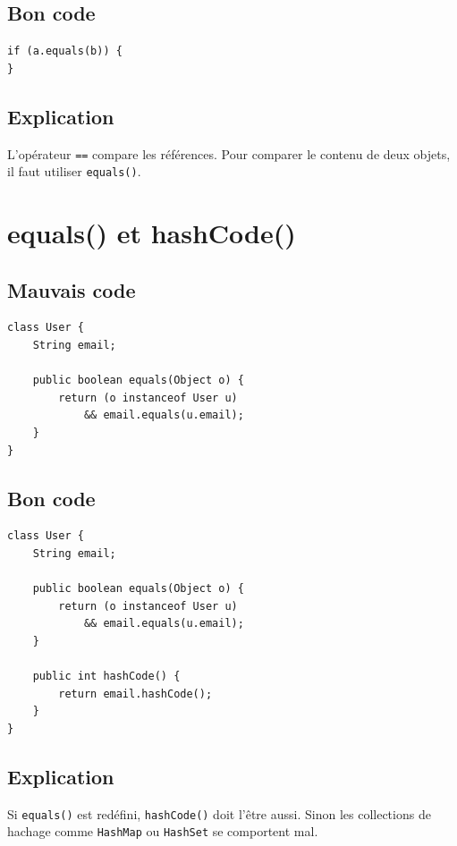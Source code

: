 \documentclass[a4paper,11pt]{report}
\begin{document}
\section{Bon code}
\begin{lstlisting}
if (a.equals(b)) {
}
\end{lstlisting}

\section{Explication}
L'opérateur \texttt{==} compare les références.
Pour comparer le contenu de deux objets, il faut utiliser \texttt{equals()}.

\chapter{equals() et hashCode()}

\section{Mauvais code}
\begin{lstlisting}
class User {
    String email;

    public boolean equals(Object o) {
        return (o instanceof User u)
            && email.equals(u.email);
    }
}
\end{lstlisting}

\section{Bon code}
\begin{lstlisting}
class User {
    String email;

    public boolean equals(Object o) {
        return (o instanceof User u)
            && email.equals(u.email);
    }

    public int hashCode() {
        return email.hashCode();
    }
}
\end{lstlisting}

\section{Explication}
Si \texttt{equals()} est redéfini, \texttt{hashCode()} doit l'être aussi.
Sinon les collections de hachage comme \texttt{HashMap} ou \texttt{HashSet} se comportent mal.

\end{document}
